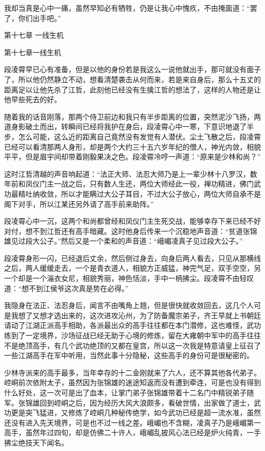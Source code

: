 我却当真是心中一痛，虽然早知必有牺牲，仍是让我心中愧疚，不由掩面道：“罢了，你们出手吧。”

第十七章    一线生机

第十七章一线生机

段凌霄早已心有准备，但是以他的身份若是我这么一说他就出手，那可就没有面子了，所以他仍然静立不动，想看清楚袭击从何而来，若是来自身后，那么十五丈的距离足以让他先杀了江哲，此刻他已经没有生擒江哲的想法了，这样的人物还是让他早些死去的好。

随着我的话音刚落，那两个侍卫前边和我只有半步距离的位置，突然泥沙飞扬，两道身影破土而出，转瞬间已经将我护在身后，段凌霄心中一寒，下意识地退了半步，怎么可能，这么近的距离自己竟然没有发觉有人潜伏。尘土飞散之后，段凌霄已经可以看清那两人身形，却是两个大约三十五六岁年纪的僧人，神光内敛，相貌平平，但是眉宇间却带着刚毅果决之色。段凌霄冷哼一声道：“原来是少林和尚？”

这时江哲清越的声音响起道：“法正大师、法忍大师乃是上一辈少林十八罗汉，数年前和凤仪门主一战之后，只有数人生还，两位大师经此一役，禅功精进，佛门武功最精吐纳收敛，所以才能瞒过大公子耳目，不过大公子放心，两位大师自承不是阁下对手，所以江某还另外请了高手前来助阵。”

段凌霄心中一沉，这两个和尚都曾经和凤仪门主生死交战，能够幸存下来已经不好对付，想不到江哲还有高手暗藏。这时他身后传来一个沉稳地声音道：“贫道张锦雄见过段大公子。”然后又是一个柔和的声音道：“峨嵋凌真子见过段大公子。”

段凌霄身形一闪，已经退后丈余，然后侧过身去，向身后两人看去，只见从那横线之后，两人缓缓走去，一个是青衣道人，相貌方正威猛，神完气足，双手空空，另一个却是一个淄衣女尼，相貌秀丽，神色恬淡，手中一柄拂尘。段凌霄不由轻叹道：“想不到江侯爷这次真是势在必得。”

我隐身在法正、法忍身后，闻言不由嘴角上翘，但是很快就收敛回去，这几个人可是我想了又想才选出来的，这次进攻沁州，为了防备魔宗弟子，齐王早就上书朝廷请动了江湖正派高手相助，各派最出众的高手往往都在本门潜修，这也难怪，武功练到了一定境界，沙场征战已经无助于心境的修炼，留在大雍朝中军中的高手往往不是绝顶高手，有几个武功绝顶的又都在皇宫，所以这一次我是特意请皇上征召了一些江湖高手在军中听用，当然此事十分隐秘，这些高手的身份可是很秘密的。

少林寺派来的高手最多，当年幸存的十二金刚就来了六人，还不算其他各代弟子。崆峒前次依附太子，虽然因为张锦雄的迷途知返而没有遭到牵连，可是也没有得到什么好处，这一次可是出了血本，让掌门弟子张锦雄带着十二名门中精锐弟子随军。张锦雄回到崆峒之后，因为经历大风大浪颇多，看破世情，出家做了道士，武功更是突飞猛进，又修炼了崆峒几种秘传绝学，如今武功已经是超一流水准，虽然还没有进入先天境界，可是也不过一线之差。峨嵋也不含糊，凌真子乃是峨嵋第一高手，虽然年过四旬，却是仿佛二十许人，峨嵋乱披风心法已经是炉火纯青，一手拂尘绝技天下闻名。

